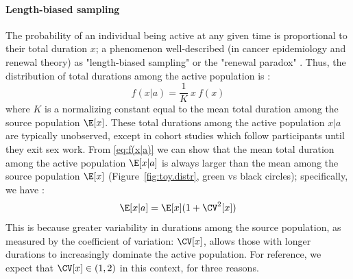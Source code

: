 \paragraph{Length-biased sampling}%
The probability of an individual being active at any given time
is proportional to their total duration $x$;
a phenomenon well-described (\eg in cancer epidemiology and renewal theory)
as "length-biased sampling" or the "renewal paradox" \cite{Kafadar2009,Ross2003}.
Thus, the distribution of total durations among the active population is
\cite{Ross2003,Tufto2017}:
\begin{equation}
  f(x|a) = \frac{1}{K} ~ x ~ f(x)
  \label{eq:f(x|a)}
\end{equation}
where $K$ is a normalizing constant equal to
the mean total duration among the source population $\E[x]$.
These total durations among the active population $x|a$ are typically unobserved,
except in cohort studies which follow participants until they exit sex work.
From \eqref{eq:f(x|a)} we can show that
the mean total duration among the active population $\E[x|a]$
is always larger than the mean among the source population $\E[x]$
(Figure~\ref{fig:toy.distr}, green vs black circles);
specifically, we have \cite{Zelen1969}:
\begin{equation}
  \E[x|a] = \E[x] (1 + \CV^2[x])
  \label{eq:E[x|a]}
\end{equation}
This is because greater variability in durations among the source population,
as measured by the coefficient of variation: $\CV[x]$,
allows those with longer durations to increasingly dominate the active population.
For reference, we expect that $\CV[x] \in (1,2)$ in this context, for three reasons.
